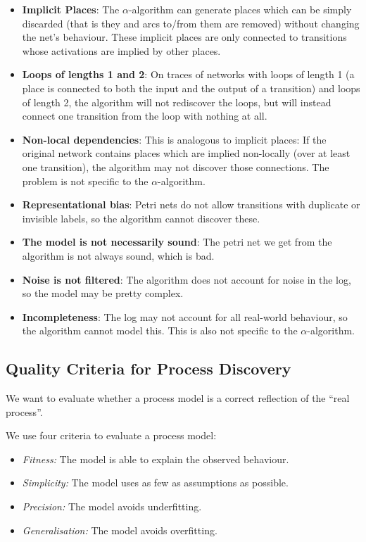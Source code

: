 \documentclass[english]{panikzettel}
\begin{document}
\begin{itemize}
    \item \textbf{Implicit Places}: The $\alpha$-algorithm can generate places which can be simply discarded (that is they and arcs to/from them are removed) without changing the net's behaviour.
    These implicit places are only connected to transitions whose activations are implied by other places.
    \item \textbf{Loops of lengths 1 and 2}: On traces of networks with loops of length 1 (a place is connected to both the input and the output of a transition) and loops of length 2, the algorithm will not rediscover the loops, but will instead connect one transition from the loop with nothing at all.
    \item \textbf{Non-local dependencies}: This is analogous to implicit places: If the original network contains places which are implied non-locally (over at least one transition), the algorithm may not discover those connections.
    The problem is not specific to the $\alpha$-algorithm.
    \item \textbf{Representational bias}: Petri nets do not allow transitions with duplicate or invisible labels, so the algorithm cannot discover these.
    \item \textbf{The model is not necessarily sound}: The petri net we get from the algorithm is not always sound, which is bad.
    \item \textbf{Noise is not filtered}: The algorithm does not account for noise in the log, so the model may be pretty complex.
    \item \textbf{Incompleteness}: The log may not account for all real-world behaviour, so the algorithm cannot model this. This is also not specific to the $\alpha$-algorithm.
\end{itemize}

\newpage

\subsection{Quality Criteria for Process Discovery}
We want to evaluate whether a process model is a correct reflection of the ``real process''.

We use four criteria to evaluate a process model:
\begin{itemize}
    \item \emph{Fitness:} The model is able to explain the observed behaviour.
    \item \emph{Simplicity:} The model uses as few as assumptions as possible.
    \item \emph{Precision:} The model avoids underfitting.
    \item \emph{Generalisation:} The model avoids overfitting.
\end{itemize}
\end{document}
